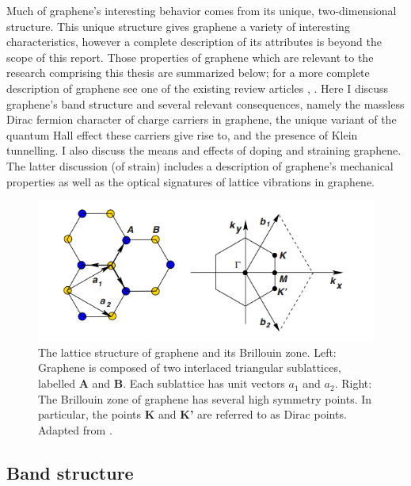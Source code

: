 \documentclass[edeposit,fullpage,draftthesis]{uiucthesis2009}
\begin{document}
    Much of graphene's interesting behavior comes from its unique, two-dimensional structure. 
    This unique structure gives graphene a variety of interesting characteristics, however a complete 
    description of its attributes is beyond the scope of this report. Those properties of graphene 
    which are relevant to the research comprising this thesis are summarized below; for a more complete description 
    of graphene see one of the existing review articles \cite{geim2007rise}, \cite{CastroNeto2009}. 
    Here I discuss graphene's band structure and several relevant consequences, namely 
    the massless Dirac fermion character of charge carriers in graphene, 
    the unique variant of the quantum Hall effect these carriers give rise to, 
    and the presence of Klein tunnelling.
    I also discuss the means and effects of doping and straining graphene. The latter discussion (of strain)
    includes a description of graphene's mechanical properties as well as the optical signatures of 
    lattice vibrations in graphene.
    
    \begin{figure}
    \centering
    \includegraphics{images/background/ElecPropertiesFig2.png}
    \caption[The lattice structure of graphene and its Brillouin zone]{The lattice structure of graphene and its Brillouin zone. Left: Graphene is composed of two interlaced triangular sublattices, labelled \textbf{A} and \textbf{B}. Each sublattice has unit vectors $a_1$ and $a_2$. Right: The Brillouin zone of graphene has several high symmetry points. In particular, the points \textbf{K} and \textbf{K'} are referred to as Dirac points. Adapted from \cite{CastroNeto2009}.}
    \label{fig:lattice}
    \end{figure}
		
	\subsection{Band structure}
    	
\end{document}
